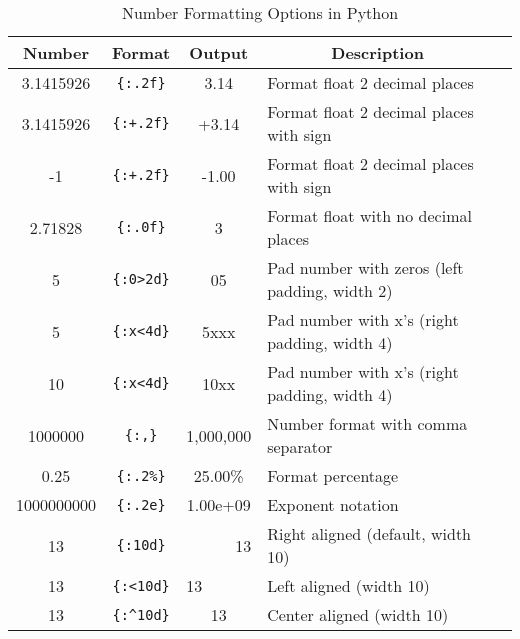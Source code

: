 \documentclass[a4paper,11pt]{book}
\numberwithin{figure}{chapter}
\numberwithin{table}{chapter}
\begin{document}
\begin{table}[!htbp]
	\centering
	\caption{Number Formatting Options in Python}
	\label{tab:number_formatting}
	\begin{tabular}{cccll}
		\toprule \toprule
		\multicolumn{1}{c}{Number} &
		\multicolumn{1}{c}{Format} & 
		\multicolumn{1}{c}{Output} & 
		\multicolumn{1}{c}{Description} \\
		\midrule
		3.1415926                           & \texttt{\{:.2f\}}                            & 3.14                                & Format float 2 decimal places                 &  \\
		3.1415926                           & \texttt{\{:+.2f\}}                           & +3.14                               & Format float 2 decimal places with sign       &  \\
		-1                                  & \texttt{\{:+.2f\}}                           & -1.00                               & Format float 2 decimal places with sign       &  \\
		2.71828                             & \texttt{\{:.0f\}}                            & 3                                   & Format float with no decimal places           &  \\
		5                                   & \texttt{\{:0\textgreater{}2d\}}              & 05                                  & Pad number with zeros (left padding, width 2) &  \\
		5                                   & \texttt{\{:x\textless{}4d\}}                 & 5xxx                                & Pad number with x’s (right padding, width 4)  &  \\
		10                                  & \texttt{\{:x\textless{}4d\}}                 & 10xx                                & Pad number with x’s (right padding, width 4)  &  \\
		1000000                             & \texttt{\{:,\}}                              & 1,000,000                           & Number format with comma separator            &  \\
		0.25                                & \texttt{\{:.2\%\}}                           & 25.00\%                             & Format percentage                             &  \\
		1000000000                          & \texttt{\{:.2e\}}                            & 1.00e+09                            & Exponent notation                             &  \\
		13                                  & \texttt{\{:10d\}}                            & \multicolumn{1}{r}{13}              & Right aligned (default, width 10)             &  \\
		13                                  & \texttt{\{:\textless{}10d\}}                 & \multicolumn{1}{l}{13}              & Left aligned (width 10)                       &  \\
		13                                  & \texttt{\{:\textasciicircum{}10d\}}          & 13                                  & Center aligned (width 10)                     \\
		\bottomrule
	\end{tabular}
\end{table}
\end{document}

